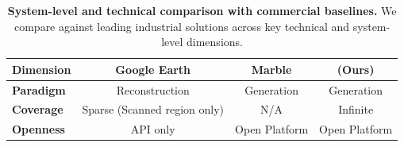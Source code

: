 \begin{table}[t]
\centering
\caption{\textbf{System-level and technical comparison with commercial baselines.} We compare \method{} against leading industrial solutions across key technical and system-level dimensions.}
\label{tab:system_comparison_merged}
\small
\begin{tabular}{l ccc}
\toprule
\textbf{Dimension} & \textbf{Google Earth} & \textbf{Marble} & \textbf{\method{} (Ours)} \\
\midrule
\textbf{Paradigm} & Reconstruction & Generation & {Generation} \\
\textbf{Coverage} & Sparse (Scanned region only) & N/A & {Infinite} \\
\textbf{Openness} & API only & Open Platform & {Open Platform} \\
\bottomrule
\end{tabular}
\end{table}